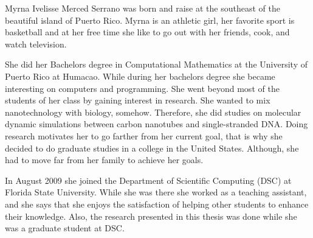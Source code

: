 \documentclass[11pt]{fsuthesis}
\begin{document}
\appendix



%





\begin{biosketch}
Myrna Ivelisse Merced Serrano was born and raise at the southeast of the beautiful island of Puerto Rico. Myrna is an athletic girl, her favorite sport is basketball and at her free time she like to go out with her friends, cook, and watch television. 

She did her Bachelors degree in Computational Mathematics at the University of Puerto Rico at Humacao. While during her bachelors degree she became interesting on computers and programming. She went beyond most of the students of her class by gaining interest in research. She wanted to mix nanotechnology with biology, somehow. Therefore, she did studies on molecular dynamic simulations between carbon nanotubes and single-stranded DNA. Doing research motivates her to go farther from her current goal, that is why she decided to do graduate studies in a college in the United States. Although, she had to move far from her family to achieve her goals.

In August 2009 she joined the Department of Scientific Computing (DSC) at Florida State University. While she was there she worked as a teaching assistant, and she says that she enjoys the satisfaction of helping other students to enhance their knowledge. Also, the research presented in this thesis was done while she was a graduate student at DSC.
\end{biosketch}
\end{document}
